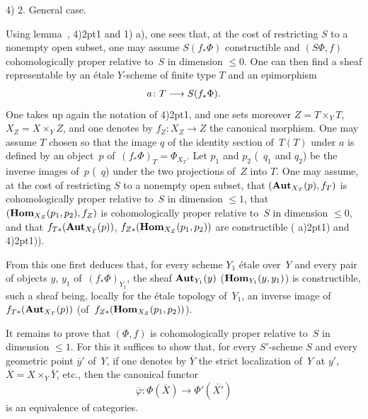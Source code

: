 4) 2. General case.\par
Using lemma~, 4)\kern2pt1 and 1)\kern2pt a), one sees that,
at the cost of restricting $S$ to a nonempty open subset, one may
assume $S(f_*\Phi)$ constructible and $(S\Phi,f)$ cohomologically
proper relative to~$S$ in dimension $\le 0$. One can then
find a sheaf representable by an \'etale $Y$-scheme
of finite type $T$ and an epimorphism
$$
a \colon T \to S(f_*\Phi)\quoi.
$$
One takes up again the notation of 4)\kern2pt1, and one sets moreover $Z=T\times_Y T$,
$X_Z=X\times_Y Z$, and one denotes by $f_Z \colon X_Z \to Z$ the canonical
morphism. One may assume $T$ chosen so that the image $q$ of the
identity section of~$T(T)$ under $a$ is defined by an object~$p$
of~$(f_*\Phi)_T=\Phi_{X_T}$. Let $p_1$ and $p_2$ (\resp~$q_1$ and
$q_2$) be the inverse images of~$p$ (\resp~$q$) under the two projections
of~$Z$ into $T$. One may assume, at the cost of restricting $S$ to
a nonempty open subset, that $(\operatorname{\mathbf{Aut}}_{X_T}(p),f_T)$ is
cohomologically proper relative to~$S$ in dimension $\le 1$,
that $(\operatorname{\mathbf{Hom}}_{X_Z}(p_1,p_2),f_Z)$ is cohomologically proper
relative to~$S$ in dimension $\le 0$, and that
$f_{T*}(\operatorname{\mathbf{Aut}}_{X_T}(p))$, $f_{Z*}(\operatorname{\mathbf{Hom}}_{X_Z}(p_1,p_2))$ are
constructible ( a)\kern2pt1) and 4)\kern2pt1)).

From this one first deduces that, for every scheme $Y_1$ \'etale over~$Y$ and every pair of objects $y$, $y_1$ of~$(f_*\Phi)_{Y_1}$, the
sheaf $\operatorname{\mathbf{Aut}}_{Y_1}(y)$ (\resp $\operatorname{\mathbf{Hom}}_{Y_1}(y,y_1)$) is
constructible, such a sheaf being, locally for the \'etale
topology of~$Y_1$, an inverse image of~$f_{T*}(\operatorname{\mathbf{Aut}}_{X_T}(p))$
(\resp of~$f_{Z*}(\operatorname{\mathbf{Hom}}_{X_Z}(p_1,p_2))$).

It remains to prove that $(\Phi,f)$ is cohomologically proper
relative
to~$S$ in dimension $\le 1$. For this it suffices to show that,
for every $S'$-scheme $S$ and every geometric point
$\overline{y}'$ of~$Y$, if one denotes by $\overline{Y}$ the strict
localization of~$Y$ at $y'$, $\overline{X}=X \times_Y \overline{Y}$, etc.,
then the canonical functor
$$
\overline{\varphi} \colon \Phi(\overline{X}) \to
\Phi'(\overline{X'})
$$
is an equivalence of categories.


